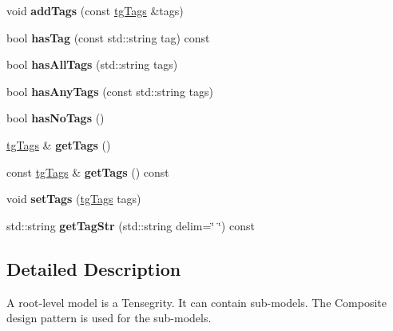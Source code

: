 \begin{DoxyCompactItemize}
\item 
\hypertarget{classtg_taggable_af28e3fe1a7e4eb28772dc006d575dd1f}{void {\bfseries add\-Tags} (const \hyperlink{classtg_tags}{tg\-Tags} \&tags)}\label{classtg_taggable_af28e3fe1a7e4eb28772dc006d575dd1f}

\item 
\hypertarget{classtg_taggable_ae31f65869c8887bfeb34a344902c4d5b}{bool {\bfseries has\-Tag} (const std\-::string tag) const }\label{classtg_taggable_ae31f65869c8887bfeb34a344902c4d5b}

\item 
\hypertarget{classtg_taggable_a33b77b1075171b63f673965687b2e844}{bool {\bfseries has\-All\-Tags} (std\-::string tags)}\label{classtg_taggable_a33b77b1075171b63f673965687b2e844}

\item 
\hypertarget{classtg_taggable_af14af28fa98021c4f20a5e8f2ddd5606}{bool {\bfseries has\-Any\-Tags} (const std\-::string tags)}\label{classtg_taggable_af14af28fa98021c4f20a5e8f2ddd5606}

\item 
\hypertarget{classtg_taggable_adff345e116e16420c701a748ff8f995f}{bool {\bfseries has\-No\-Tags} ()}\label{classtg_taggable_adff345e116e16420c701a748ff8f995f}

\item 
\hypertarget{classtg_taggable_acf1d7fa9df8f374f25015c4080902681}{\hyperlink{classtg_tags}{tg\-Tags} \& {\bfseries get\-Tags} ()}\label{classtg_taggable_acf1d7fa9df8f374f25015c4080902681}

\item 
\hypertarget{classtg_taggable_ae70d7d3b45301665bc363b0ed8b9b292}{const \hyperlink{classtg_tags}{tg\-Tags} \& {\bfseries get\-Tags} () const }\label{classtg_taggable_ae70d7d3b45301665bc363b0ed8b9b292}

\item 
\hypertarget{classtg_taggable_a5492888e4e4da4cca6261070b5726adf}{void {\bfseries set\-Tags} (\hyperlink{classtg_tags}{tg\-Tags} tags)}\label{classtg_taggable_a5492888e4e4da4cca6261070b5726adf}

\item 
\hypertarget{classtg_taggable_a346d66b066d2d9eb1eadba01da43749f}{std\-::string {\bfseries get\-Tag\-Str} (std\-::string delim=\char`\"{} \char`\"{}) const }\label{classtg_taggable_a346d66b066d2d9eb1eadba01da43749f}

\end{DoxyCompactItemize}


\subsection{Detailed Description}
A root-\/level model is a Tensegrity. It can contain sub-\/models. The Composite design pattern is used for the sub-\/models. 

